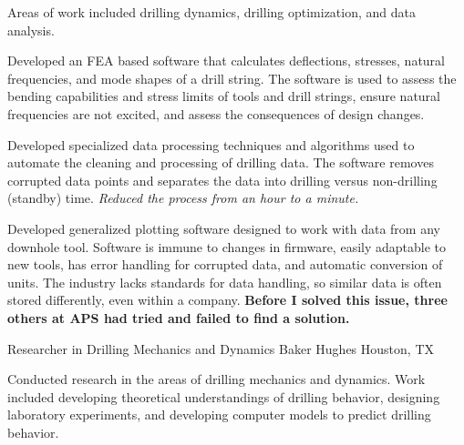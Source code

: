 \documentclass{leresume}
\begin{document}
					\noindent Areas of work included drilling dynamics, drilling optimization, and data analysis.
		\begin{bulletedlist}
			
		\item 
					Developed an FEA based software that calculates deflections, stresses, natural frequencies, and mode shapes of a drill string.  The software is used to assess the bending capabilities and stress limits of tools and drill strings, ensure natural frequencies are not excited, and assess the consequences of design changes.
					
		\item 
					Developed specialized data processing techniques and algorithms used to automate the cleaning and processing of drilling data.  The software removes corrupted data points and separates the data into drilling versus non-drilling (standby) time.  
		\textit{Reduced the process from an hour to a minute.}
	
		\item 
					Developed generalized plotting software designed to work with data from any downhole tool.  Software is immune to changes in firmware, easily adaptable to new tools, has error handling for corrupted data, and automatic conversion of units.  The industry lacks standards for data handling, so similar data is often stored differently, even within a company.  
		\textbf{Before I solved this issue, three others at APS had tried and failed to find a solution.}
	
		\end{bulletedlist}
	
            {Researcher in Drilling Mechanics and Dynamics}
            {Baker Hughes}
			{Houston, TX}
			
					\noindent 
				Conducted research in the areas of drilling mechanics and dynamics.  Work included developing theoretical understandings of drilling behavior, designing laboratory experiments, and developing computer models to predict drilling behavior.
			
\end{document}
